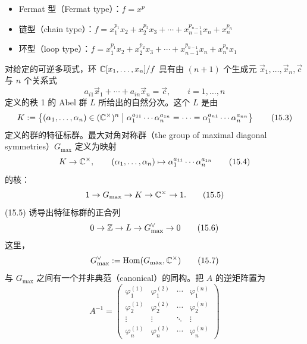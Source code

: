 \begin{itemize}
  \item Fermat 型（Fermat type）：$f=x^p$
  \item 链型（chain type）：$f=x_1^{p_1}x_2+x_2^{p_2}x_3+\cdots+x_{n-1}^{p_{n-1}}x_n+x_n^{p_n}$
  \item 环型（loop type）：$f=x_1^{p_1}x_2+x_2^{p_2}x_3+\cdots+x_{n-1}^{p_{n-1}}x_n+x_n^{p_n}x_1$
\end{itemize}

对给定的可逆多项式，环 $\mathbb{C}[x_1,\ldots,x_n]/f$ 具有由 $(n+1)$ 个生成元 $\vec x_1,\ldots,\vec x_n,\vec c$ 与 $n$ 个关系式
\begin{equation}
  a_{i1}\vec x_1+\cdots+a_{in}\vec x_n=\vec c,\qquad i=1,\ldots,n
  \tag{15.2}
\end{equation}
定义的秩 1 的 Abel 群 $L$ 所给出的自然分次。这个 $L$ 是由
\begin{equation}
  K:=\left\{(\alpha_1,\ldots,\alpha_n)\in(\mathbb{C}^\times)^n\;\middle|\;
  \alpha_1^{a_{11}}\cdots\alpha_n^{a_{1n}}=\cdots=\alpha_1^{a_{n1}}\cdots\alpha_n^{a_{nn}}\right\}
  \tag{15.3}
\end{equation}
定义的群的特征标群。最大对角对称群（the group of maximal diagonal symmetries）$G_{\max}$ 定义为映射
\begin{equation}
  K\to\mathbb{C}^\times,\qquad (\alpha_1,\ldots,\alpha_n)\mapsto\alpha_1^{a_{11}}\cdots\alpha_n^{a_{1n}}
  \tag{15.4}
\end{equation}
的核：
\begin{equation}
  1\to G_{\max}\to K\to\mathbb{C}^\times\to1.
  \tag{15.5}
\end{equation}
(15.5) 诱导出特征标群的正合列
\begin{equation}
  0\to\mathbb{Z}\to L\to G_{\max}^{\vee}\to0
  \tag{15.6}
\end{equation}
这里，
\begin{equation}
  G_{\max}^{\vee}:=\operatorname{Hom}(G_{\max},\mathbb{C}^\times)
  \tag{15.7}
\end{equation}
与 $G_{\max}$ 之间有一个并非典范（canonical）的同构。把 $A$ 的逆矩阵置为
\begin{equation}
  A^{-1}=
  \begin{pmatrix}
    \varphi_1^{(1)} & \varphi_1^{(2)} & \cdots & \varphi_1^{(n)}\\
    \varphi_2^{(1)} & \varphi_2^{(2)} & \cdots & \varphi_2^{(n)}\\
    \vdots & \vdots & \ddots & \vdots\\
    \varphi_n^{(1)} & \varphi_n^{(2)} & \cdots & \varphi_n^{(n)}
  \end{pmatrix}
  \tag{15.8}
\end{equation}
